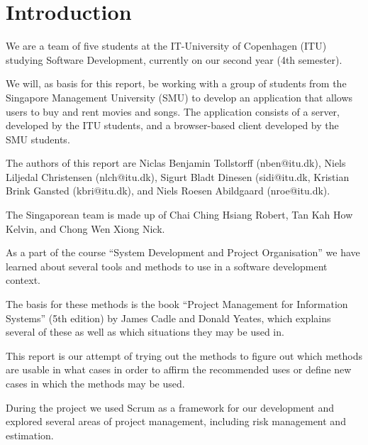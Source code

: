 \section{Introduction}

We are a team of five students at the IT-University of Copenhagen (ITU) studying Software
Development, currently on our second year (4th semester).

We will, as basis for this report, be working with a group of students from the Singapore
Management University (SMU) to develop an application that allows users to buy and rent
movies and songs. The application consists of a server, developed by the ITU students,
and a browser-based client developed by the SMU students.

The authors of this report are Niclas Benjamin Tollstorff (nben@itu.dk), Niels Liljedal
Christensen (nlch@itu.dk), Sigurt Bladt Dinesen (sidi@itu.dk, Kristian Brink Gansted
(kbri@itu.dk), and Niels Roesen Abildgaard (nroe@itu.dk).

The Singaporean team is made up of Chai Ching Hsiang Robert, Tan Kah How Kelvin, and
Chong Wen Xiong Nick.

As a part of the course “System Development and Project Organisation” we have learned
about several tools and methods to use in a software development context.

The basis for these methods is the book “Project Management for Information Systems”
(5th edition) by James Cadle and Donald Yeates, which explains several of these as well
as which situations they may be used in.

This report is our attempt of trying out the methods to figure out which methods are
usable in what cases in order to affirm the recommended uses or define new cases in
which the methods may be used.

During the project we used Scrum as a framework for our development and explored several
areas of project management, including risk management and estimation.